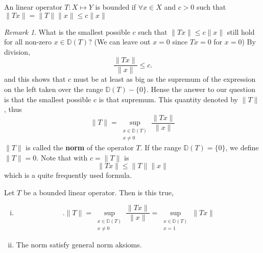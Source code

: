 \documentclass{article}
\theoremstyle{remark}
\newtheorem*{remark}{Remark}
\begin{document}
\begin{definition}
  An linear operator $T: X \mapsto Y$ is bounded if $\forall x \in X$ and $c > 0$ such that $\|Tx\|= \|T\|\|x\| \le c \|x\|$
\end{definition}
\begin{remark}
  What is the smallest possible $c$ such that $\|Tx\| \le c \|x\|$ still hold for all non-zero $x \in \mathbb{D}\left( T \right) $? (We can leave out $x=0$ since $Tx=0$ for $x=0$) By division, \[
  \frac{\|Tx\|}{\|x\|} \le c.
\] and this shows that  $c$ must be at least as big as the supremum of the expression on the left taken over the range $\mathbb{D}\left( T \right) - \{0\} $. Hense the answer to our question is that the smallest possible c is that supremum. This quantity denoted by $\|T\|$, thus \[
\|T\| = \sup_{\substack{ x \in \mathbb{D}\left( T \right) \\ x \neq 0}}  \frac{\|Tx\|}{\|x\|}
\] 
$\|T\|$ is called the \textbf{norm} of the operator $T$. If the range $\mathbb{D}\left( T \right) = \{0\} $, we define $\|T\| = 0$. Note that with $c = \|T\|$ is \[
\|Tx\| \le  \|T\| \|x\| 
\] which is a quite frequently used formula. 

\end{remark}

\begin{lemma}
  Let $T$ be a bounded linear operator. Then is this true,
  \begin{enumerate}[(i)]
    \item 
\[
.
        \|T\| = \sup_{\substack{x \in \mathbb{D}\left( T \right) \\ x \neq 0 } }  \frac{\|Tx\|}{\|x\|}= \sup_{\substack{x \in \mathbb{D}\left( T \right) \\ x = 1 } } \|Tx\| 
\] 
    \item The norm satisfy general norm aksioms.
  \end{enumerate}
\end{lemma}
\end{document}
